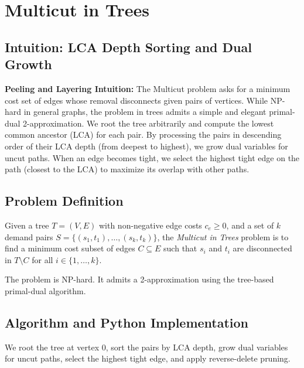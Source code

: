 \setcounter{chapter}{29}
\chapter{Multicut in Trees}
\label{ch:tree_multicut}

\section{Intuition: LCA Depth Sorting and Dual Growth}

\begin{intuitionbox}
\textbf{Peeling and Layering Intuition:} The Multicut problem asks for a minimum cost set of edges whose removal disconnects given pairs of vertices. While NP-hard in general graphs, the problem in trees admits a simple and elegant primal-dual 2-approximation. We root the tree arbitrarily and compute the lowest common ancestor (LCA) for each pair. By processing the pairs in descending order of their LCA depth (from deepest to highest), we grow dual variables for uncut paths. When an edge becomes tight, we select the highest tight edge on the path (closest to the LCA) to maximize its overlap with other paths.
\end{intuitionbox}

\section{Problem Definition}
Given a tree $T = (V, E)$ with non-negative edge costs $c_e \ge 0$, and a set of $k$ demand pairs $S = \{(s_1, t_1), \dots, (s_k, t_k)\}$, the \emph{Multicut in Trees} problem is to find a minimum cost subset of edges $C \subseteq E$ such that $s_i$ and $t_i$ are disconnected in $T \setminus C$ for all $i \in \{1, \dots, k\}$.

The problem is NP-hard. It admits a 2-approximation using the tree-based primal-dual algorithm.

\section{Algorithm and Python Implementation}
We root the tree at vertex 0, sort the pairs by LCA depth, grow dual variables for uncut paths, select the highest tight edge, and apply reverse-delete pruning.

